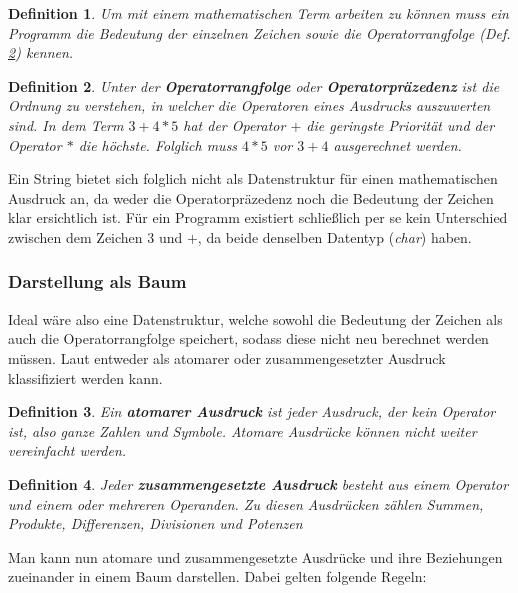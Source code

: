 \documentclass[11pt]{article}
\newtheorem{defin}{Definition}
\newcommand{\lab}[1]{(Def. \ref{#1})}
\begin{document}
\begin{defin}
  Um mit einem mathematischen Term arbeiten zu können muss ein Programm die Bedeutung
  der einzelnen Zeichen sowie die Operatorrangfolge \lab{def:operatorrangfolge} kennen.
\label{def:programm_infos}
\end{defin}

\begin{defin}
Unter der \textbf{Operatorrangfolge} oder \textbf{Operatorpräzedenz} ist die Ordnung zu verstehen, 
in welcher die Operatoren eines Ausdrucks auszuwerten sind.
In dem Term $3+4*5$ hat der Operator $+$ die geringste Priorität und der Operator $*$ die höchste. 
Folglich muss $4*5$ vor $3+4$ ausgerechnet werden. 
\label{def:operatorrangfolge}
\end{defin}

Ein String bietet sich folglich nicht als Datenstruktur für einen mathematischen Ausdruck 
an, da weder die Operatorpräzedenz noch die Bedeutung der Zeichen klar ersichtlich ist.
Für ein Programm existiert schließlich per se kein Unterschied zwischen dem Zeichen $3$ und $+$, 
da beide denselben Datentyp (\textit{char}) haben.

\subsubsection{Darstellung als Baum}

Ideal wäre also eine Datenstruktur, welche sowohl die Bedeutung der Zeichen als auch die Operatorrangfolge speichert,
sodass diese nicht neu berechnet werden müssen. \newline
Laut \citeauthor{CAS_EA} \cite[81]{CAS_EA} entweder als atomarer 
oder zusammengesetzter Ausdruck klassifiziert werden kann.

\begin{defin}
Ein \textbf{atomarer Ausdruck} ist jeder Ausdruck, der kein Operator ist, also ganze Zahlen und Symbole. 
Atomare Ausdrücke können nicht weiter vereinfacht werden.
\label{def:atomarer_ausdruck}
\end{defin}

\begin{defin}
Jeder \textbf{zusammengesetzte Ausdruck} besteht aus einem Operator und einem oder mehreren Operanden. 
Zu diesen Ausdrücken zählen Summen, Produkte, Differenzen, Divisionen und Potenzen
\label{def:zusammengesetzter_ausdruck}
\end{defin}

Man kann nun atomare und zusammengesetzte Ausdrücke und ihre Beziehungen zueinander in einem Baum darstellen.
Dabei gelten folgende Regeln:
\end{document}

